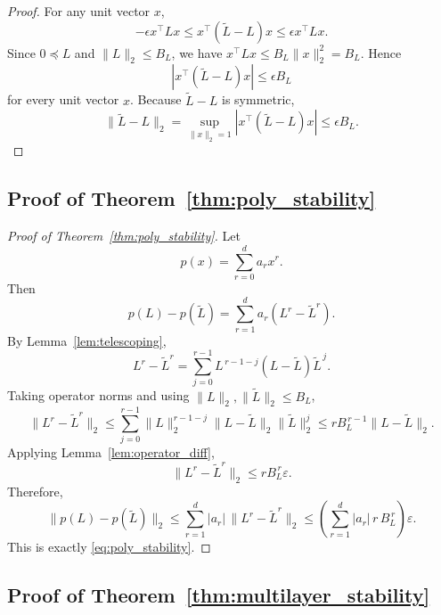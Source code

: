 \documentclass{article}
\begin{document}
\begin{proof}
For any unit vector $x$,
\[
-\epsilon x^\top Lx \le x^\top(\widetilde L-L)x
\le \epsilon x^\top Lx.
\]
Since $0\preceq L$ and $\|L\|_2\le B_L$, we have
$x^\top Lx\le B_L\|x\|_2^2=B_L$. Hence
\[
|x^\top(\widetilde L-L)x|\le \epsilon B_L
\]
for every unit vector $x$. Because $\widetilde L-L$ is symmetric,
\[
\|\widetilde L-L\|_2
=
\sup_{\|x\|_2=1}|x^\top(\widetilde L-L)x|
\le \epsilon B_L .
\]
\end{proof}


\subsection{Proof of Theorem~\ref{thm:poly_stability}}
\label{app:poly_stability}

\begin{proof}[Proof of Theorem~\ref{thm:poly_stability}]
Let
\[
p(x)=\sum_{r=0}^d a_r x^r.
\]
Then
\[
p(L)-p(\widetilde L)=\sum_{r=1}^d a_r (L^r-\widetilde L^r).
\]
By Lemma~\ref{lem:telescoping},
\[
L^r-\widetilde L^r
=
\sum_{j=0}^{r-1} L^{\,r-1-j}(L-\widetilde L)\widetilde L^{\,j}.
\]
Taking operator norms and using $\|L\|_2,\|\widetilde L\|_2\le B_L$,
\[
\|L^r-\widetilde L^r\|_2
\le
\sum_{j=0}^{r-1}\|L\|_2^{r-1-j}\|L-\widetilde L\|_2\|\widetilde L\|_2^j
\le
r B_L^{\,r-1}\|L-\widetilde L\|_2.
\]
Applying Lemma~\ref{lem:operator_diff},
\[
\|L^r-\widetilde L^r\|_2
\le
r B_L^{\,r}\varepsilon.
\]
Therefore,
\[
\|p(L)-p(\widetilde L)\|_2
\le
\sum_{r=1}^d |a_r|\,\|L^r-\widetilde L^r\|_2
\le
\left(\sum_{r=1}^d |a_r|\,r\,B_L^{\,r}\right)\varepsilon.
\]
This is exactly \eqref{eq:poly_stability}.
\end{proof}

\subsection{Proof of Theorem~\ref{thm:multilayer_stability}}
\label{app:multilayer_stability}
\end{document}
